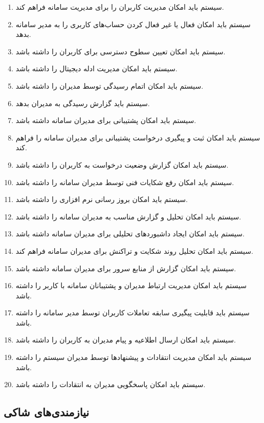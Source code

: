 \documentclass[12pt,a4paper,oneside]{article}
\begin{document}
	\begin{enumerate}[label=.R\arabic*]
		\item سیستم باید امکان مدیریت کاربران را برای مدیریت سامانه فراهم کند.
		\item سیستم باید امکان فعال یا غیر فعال کردن حساب‌های کاربری را به مدیر سامانه بدهد.
		\item سیستم باید امکان تعیین سطوح دسترسی برای کاربران را داشته باشد.
		\item سیستم باید امکان مدیریت ادله دیجیتال را داشته باشد.
		\item سیستم باید امکان اتمام رسیدگی توسط مدیران را داشته باشد.
		\item سیستم باید گزارش رسیدگی به مدیران بدهد.
		\item سیستم باید امکان پشتیبانی برای مدیران سامانه داشته باشد.
		\item سیستم باید امکان ثبت و پیگیری درخواست پشتیبانی برای مدیران سامانه را فراهم کند.
		\item سیستم باید امکان گزارش وضعیت درخواست به کاربران را داشته باشد.
		\item سیستم باید امکان رفع شکایات فنی توسط مدیران سامانه را داشته باشد.
		\item سیستم باید امکان بروز رسانی نرم افزاری را داشته باشد.
		\item سیستم باید امکان تحلیل و گزارش مناسب به مدیران سامانه را داشته باشد.
		\item سیستم باید امکان ایجاد داشبوردهای تحلیلی برای مدیران سامانه داشته باشد.
		\item سیستم باید امکان تحلیل روند شکایت و تراکنش برای مدیران سامانه فراهم کند.
		\item سیستم باید امکان گزارش از منابع سرور برای مدیران سامانه داشته باشد.
		\item سیستم باید امکان مدیریت ارتباط مدیران و پشتیبانان سامانه با کاربر را داشته باشد.
		\item سیستم باید قابلیت پیگیری سابقه تعاملات کاربران توسط مدیر سامانه را داشته باشد.
		\item سیستم باید امکان ارسال اطلاعیه و پیام مدیران به کاربران را داشته باشد.
		\item سیستم باید امکان مدیریت انتقادات و پیشنهادها توسط مدیران سیستم را داشته باشد.
		\item سیستم باید امکان پاسخگویی مدیران به انتقادات را داشته باشد.
	\end{enumerate}
	
	\subsection*{نیازمندی‌های شاکی}
	
\end{document}
